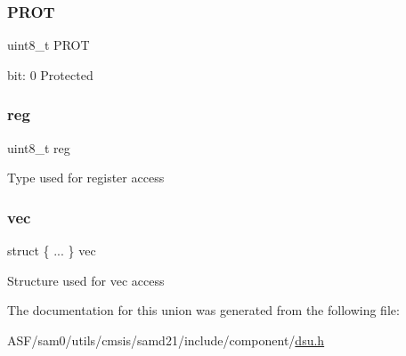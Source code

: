 \subsubsection{\texorpdfstring{PROT}{PROT}}
{\footnotesize\ttfamily uint8\+\_\+t P\+R\+OT}

bit\+: 0 Protected \mbox{\label{union_d_s_u___s_t_a_t_u_s_b___type_a9428adc9af4653a2050e2536b55dec8d}} 
\subsubsection{\texorpdfstring{reg}{reg}}
{\footnotesize\ttfamily uint8\+\_\+t reg}

Type used for register access \mbox{\label{union_d_s_u___s_t_a_t_u_s_b___type_a71bba1c5c155daf1c4e4a2501d8e7461}} 
\subsubsection{\texorpdfstring{vec}{vec}}
{\footnotesize\ttfamily struct \{ ... \}   vec}

Structure used for vec access 

The documentation for this union was generated from the following file\+:\begin{DoxyCompactItemize}
\item 
A\+S\+F/sam0/utils/cmsis/samd21/include/component/\mbox{\hyperlink{component_2dsu_8h}{dsu.\+h}}\end{DoxyCompactItemize}

